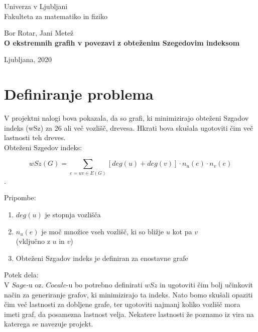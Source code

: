\documentclass[12pt, a4paper]{article}
\begin{document}
\begin{titlepage}
\begin{center}

\large
Univerza v Ljubljani\\
\normalsize
Fakulteta za matematiko in fiziko\\

\vspace{3 cm} 

\large
Bor Rotar, Jani Metež\\

\vspace{3 cm}
\LARGE
\textbf{O ekstremnih grafih v povezavi z obteženim Szegedovim indeksom}

\vfill

\large Ljubljana, 2020

\end{center}
\end{titlepage}

\newpage

\section[Definiranje problema]{Definiranje problema}

V projektni nalogi bova pokazala, da so grafi, ki minimizirajo obteženi Szgadov indeks (wSz) za 26 ali več vozlišč, drevesa. Hkrati bova skušala ugotoviti čim več lastnosti teh dreves.\\

Obteženi Szgedov indeks:
\begin{center}
 $$wSz(G) =\sum_{e=uv \in E(G)}[deg(u)+ deg(v) ]\cdot n_{u}(e)\cdot n_{v}(e)$$.
\end{center}
\medskip
Pripombe:
\begin{enumerate}
\item $deg(u)$ je stopnja vozlišča
\item $n_{u}(e)$ je moč množice vseh vozlišč, ki so bližje $u$ kot pa $v$ \\ (vključno z $u$ in $v$)
\item Obteženi Szgadov indeks je definiran za enostavne grafe
\end{enumerate}
\medskip

\medskip
Potek dela: \\

V $Sage$-u oz. $Cocalc$-u bo potrebno definirati $wSz$ in ugotoviti čim bolj učinkovit način za generiranje grafov, ki minimizirajo ta indeks. Nato bomo skušali opaziti čim več lastnosti za dobljene grafe, ter ugotoviti najmanj koliko vozlišč mora imeti graf, da posamezna lastnost velja. Nekatere lastnosti že poznamo iz vira na katerega se navezuje projekt.
\end{document}
